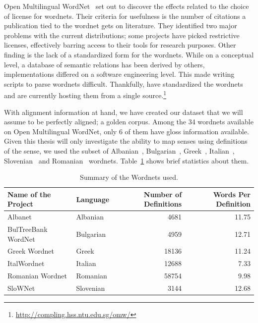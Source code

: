 Open Multilingual WordNet~\cite{bond_survey_2012} set out to discover the effects related to the choice of license for wordnets.
Their criteria for usefulness is the number of citations a publication tied to the wordnet gets on literature.
They identified two major problems with the current distributions;
some projects have picked restrictive licenses, effectively barring access to their tools for research purposes.
Other finding is the lack of a standardized form for the wordnets.
While on a conceptual level, a database of semantic relations has been derived by others, implementations differed on a software engineering level.
This made writing scripts to parse wordnets difficult.
Thankfully, \citeauthor{bond_survey_2012} have standardized the wordnets and are currently hosting them from a single source.\footnote{\url{http://compling.hss.ntu.edu.sg/omw/}}

With alignment information at hand, we have created our dataset that we will assume to be perfectly aligned; a golden corpus.
Among the 34 wordnets available on Open Multilingual WordNet, only 6 of them have gloss information available.
Given this thesis will only investigate the ability to map senses using definitions of the sense, we used the subset of Albanian~\cite{ruci_current_2008}, Bulgarian~\cite{simov_constructing_2010}, Greek~\cite{stamou_exploring_2004}, Italian~\cite{pianta_multiwordnet_2002}, Slovenian~\cite{fiser_slownet_2012} and Romanian~\cite{tufis_romanian_2008} wordnets.
Table~\ref{tab:summary_table} shows brief statistics about them.

\begin{table}[!hbp]
    \begin{center}
        \caption{Summary of the Wordnets used.}\label{tab:summary_table}
        \begin{tabular}{llrr}
            \toprule%
            \textbf{Name of the Project} & \textbf{Language} & \textbf{Number of Definitions} & \textbf{Words Per Definition} \\
            \midrule%
            Albanet & Albanian & 4681 & 11.75 \\
            BulTreeBank WordNet & Bulgarian & 4959 & 12.71 \\
            Greek Wordnet & Greek & 18136 & 11.24 \\
            ItalWordnet & Italian & 12688 & 7.33 \\
            Romanian Wordnet & Romanian & 58754 & 9.98 \\
            SloWNet & Slovenian & 3144 & 12.68 \\
            \bottomrule %
        \end{tabular}
    \end{center}
\end{table}


